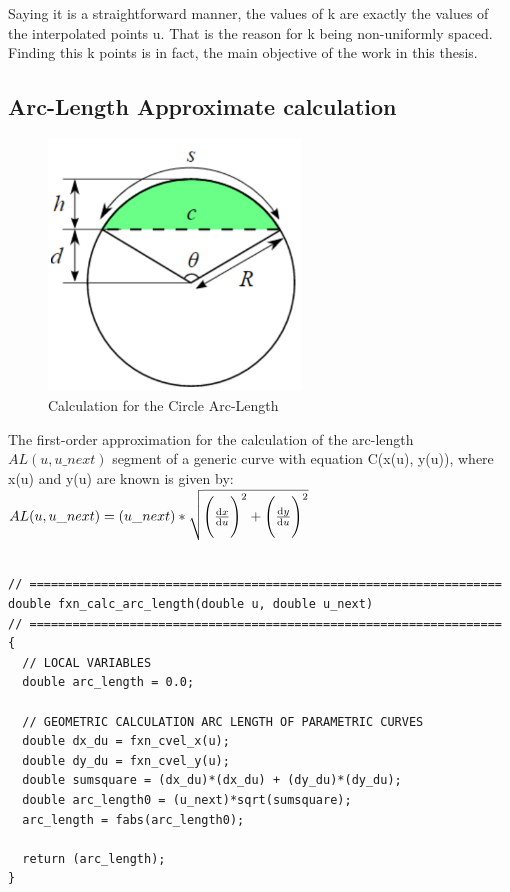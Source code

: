 \noindent
Saying it is a straightforward manner, the values of k are exactly the values of the interpolated points u. That is the reason for k being non-uniformly spaced. Finding this k points is in fact, the main objective of the work in this thesis.

\clearpage
\pagebreak

\subsection{Arc-Length Approximate calculation}
\label{chap3-Arc-Length Approximate calculation}

\begin{figure}
\caption    {Calculation for the Circle Arc-Length}
\label{chap3-Calculation for the Circle Arc-Length}
\centering
\includegraphics[width=0.60\textwidth,]{Chap3/images/Calculation-of-arc-segment-of-a-circle.png} 
\end{figure}

\noindent
The first-order approximation for the calculation of the arc-length $AL(u, u\_next)$ segment of a generic curve with equation C(x(u), y(u)), where x(u) and y(u) are known is given by:\\

\noindent
$ AL(u, u\_next) = (u\_next) * \sqrt{ {{\Bigg ( \odv{x}{u} \Bigg )^{2}} + {\Bigg ( \odv{y}{u} \Bigg )^{2} }} }  $  \\

\begin{lstlisting}[caption={Implementation for Approximate Arc-Length Calculation}, label=lst-Implementation for Approximate Arc-Length Calculation]

// ==================================================================
double fxn_calc_arc_length(double u, double u_next)
// ==================================================================
{
  // LOCAL VARIABLES
  double arc_length = 0.0;
	
  // GEOMETRIC CALCULATION ARC LENGTH OF PARAMETRIC CURVES
  double dx_du = fxn_cvel_x(u);
  double dy_du = fxn_cvel_y(u);
  double sumsquare = (dx_du)*(dx_du) + (dy_du)*(dy_du);
  double arc_length0 = (u_next)*sqrt(sumsquare);
  arc_length = fabs(arc_length0);

  return (arc_length);
}
\end{lstlisting}


